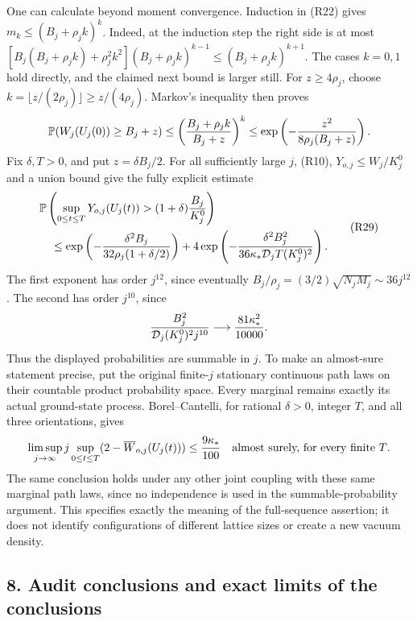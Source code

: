 \documentclass[11pt]{article}
\begin{document}
One can calculate beyond moment convergence. Induction in (R22) gives
\(m_k\le(B_j+\rho_j k)^k\).
Indeed, at the induction step the right side is at most
\([B_j(B_j+\rho_jk)+\rho_j^2k^2](B_j+\rho_jk)^{k-1}
\le(B_j+\rho_jk)^{k+1}\).
The cases \(k=0,1\) hold directly, and the claimed next bound is
larger still. For \(z\ge4\rho_j\), choose
\(k=\lfloor z/(2\rho_j)\rfloor\ge z/(4\rho_j)\).
Markov's inequality then proves
\[
 \mathbb P(W_j(U_j(0))\ge B_j+z)
 \le\left({B_j+\rho_jk\over B_j+z}\right)^k
 \le\exp\left(-{z^2\over8\rho_j(B_j+z)}\right).
\]
Fix \(\delta,T>0\), and put \(z=\delta B_j/2\).
For all sufficiently large \(j\), (R10), \(Y_{o,j}\le W_j/K_j^0\)
and a union bound give the fully explicit estimate
\[
\begin{aligned}
 &\mathbb P\left(\sup_{0\le t\le T}Y_{o,j}(U_j(t))
                       >(1+\delta){B_j\over K_j^0}\right)\\
 &\quad\le
 \exp\left(-{\delta^2B_j\over32\rho_j(1+\delta/2)}\right)
 +4\exp\left(-{\delta^2B_j^2\over
                  36\kappa_*\mathcal D_jT(K_j^0)^2}\right).
\end{aligned}\tag{R29}
\]
The first exponent has order \(j^{12}\), since eventually
\(B_j/\rho_j=(3/2)\sqrt{N_jM_j}\sim36j^{12}\).
The second has order \(j^{10}\), since
\[
 {B_j^2\over\mathcal D_j(K_j^0)^2j^{10}}
       \longrightarrow {81\kappa_*^2\over10000}.
\]
Thus the displayed probabilities are summable in \(j\).
To make an almost-sure statement precise, put the original
finite-\(j\) stationary continuous path laws on their countable
product probability space. Every marginal remains exactly its
actual ground-state process. Borel–Cantelli, for rational
\(\delta>0\), integer \(T\), and all three orientations, gives
\[
 \limsup_{j\to\infty}j\sup_{0\le t\le T}
       (2-\overline W_{o,j}(U_j(t)))
       \le {9\kappa_*\over100}
 \quad\hbox{almost surely, for every finite \(T\).}
\]
The same conclusion holds under any other joint coupling with these
same marginal path laws, since no independence is used in the
summable-probability argument. This specifies exactly the meaning
of the full-sequence assertion; it does not identify configurations
of different lattice sizes or create a new vacuum density.

\subsection*{8. Audit conclusions and exact limits of the conclusions}
\end{document}
